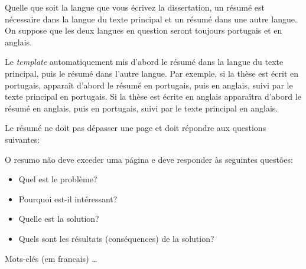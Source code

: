 Quelle que soit la langue que vous écrivez la dissertation, un résumé est nécessaire dans la langue du texte principal et un résumé dans une autre langue. On suppose que les deux langues en question seront toujours portugais et en anglais.

Le \emph{template} automatiquement mis d'abord le résumé dans la langue du texte principal, puis le résumé dans l'autre langue. Par exemple, si la thèse est écrit en portugais, apparaît d'abord le résumé en portugais, puis en anglais, suivi par le texte principal en portugais. Si la thèse est écrite en anglais apparaîtra d'abord le résumé en anglais, puis en portugais, suivi par le texte principal en anglais.

Le résumé ne doit pas dépasser une page et doit répondre aux questions suivantes:

O resumo não deve exceder uma página e deve responder às seguintes questões:
\begin{itemize}
	\item Quel est le problème?
	\item Pourquoi est-il intéressant?
	\item Quelle est la solution?
	\item Quels sont les résultats (conséquences) de la solution?
\end{itemize}

\begin{keywords}
Mots-clés (em francais) \ldots
\end{keywords}
